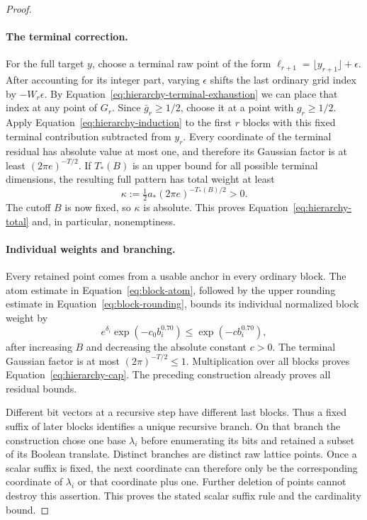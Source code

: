 \begin{proof}
\paragraph{The terminal correction.}
For the full target $y$, choose a terminal raw point of the form
$\ell_{r+1}=\lfloor y_{r+1}\rfloor+\epsilon$.
After accounting for its integer part, varying $\epsilon$ shifts the last
ordinary grid index by $-W_r\epsilon$.  By
Equation~\eqref{eq:hierarchy-terminal-exhaustion} we can place that index at
any point of $G_r$.  Since $\bar g_r\ge1/2$, choose it at a point with
$g_r\ge1/2$.  Apply Equation~\eqref{eq:hierarchy-induction} to the first $r$
blocks with this fixed terminal contribution subtracted from $y_r$.
Every coordinate of the terminal residual has absolute value at most one,
and therefore its Gaussian factor is at least $(2\pi e)^{-T/2}$.
If $T_*(B)$ is an upper bound for all possible terminal dimensions, the
resulting full pattern has total weight at least
\[
 \kappa:=\tfrac12 a_*(2\pi e)^{-T_*(B)/2}>0.
\]
The cutoff $B$ is now fixed, so $\kappa$ is absolute.  This proves
Equation~\eqref{eq:hierarchy-total} and, in particular, nonemptiness.

\paragraph{Individual weights and branching.}
Every retained point comes from a usable anchor in every ordinary block.
The atom estimate in Equation~\eqref{eq:block-atom}, followed by the upper
rounding estimate in Equation~\eqref{eq:block-rounding}, bounds its
individual normalized block weight by
\[
 e^{\delta_i}\exp(-c_0 b_i^{0.70})
 \le \exp(-c b_i^{0.70}),
\]
after increasing $B$ and decreasing the absolute constant $c>0$.
The terminal Gaussian factor is at most $(2\pi)^{-T/2}\le1$.
Multiplication over all blocks proves Equation~\eqref{eq:hierarchy-cap}.
The preceding construction already proves all residual bounds.

Different bit vectors at a recursive step have different last blocks.
Thus a fixed suffix of later blocks identifies a unique recursive branch.
On that branch the construction chose one base $\lambda_i$ before
enumerating its bits and retained a subset of its Boolean translate.
Distinct branches are distinct raw lattice points. Once a scalar suffix is fixed,
the next coordinate can therefore only be the corresponding coordinate
of $\lambda_i$ or that coordinate plus one.  Further deletion of points
cannot destroy this assertion.  This proves the stated scalar suffix
rule and the cardinality bound.


\end{proof}
